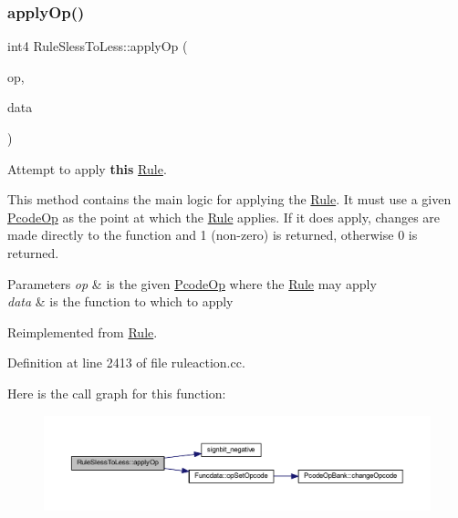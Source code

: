 \subsubsection{\texorpdfstring{applyOp()}{applyOp()}}
{\footnotesize\ttfamily int4 Rule\+Sless\+To\+Less\+::apply\+Op (\begin{DoxyParamCaption}\item[{\mbox{\hyperlink{class_pcode_op}{Pcode\+Op}} $\ast$}]{op,  }\item[{\mbox{\hyperlink{class_funcdata}{Funcdata}} \&}]{data }\end{DoxyParamCaption})\hspace{0.3cm}{\ttfamily [virtual]}}



Attempt to apply {\bfseries{this}} \mbox{\hyperlink{class_rule}{Rule}}. 

This method contains the main logic for applying the \mbox{\hyperlink{class_rule}{Rule}}. It must use a given \mbox{\hyperlink{class_pcode_op}{Pcode\+Op}} as the point at which the \mbox{\hyperlink{class_rule}{Rule}} applies. If it does apply, changes are made directly to the function and 1 (non-\/zero) is returned, otherwise 0 is returned. 
\begin{DoxyParams}{Parameters}
{\em op} & is the given \mbox{\hyperlink{class_pcode_op}{Pcode\+Op}} where the \mbox{\hyperlink{class_rule}{Rule}} may apply \\
\hline
{\em data} & is the function to which to apply \\
\hline
\end{DoxyParams}


Reimplemented from \mbox{\hyperlink{class_rule_a4e3e61f066670175009f60fb9dc60848}{Rule}}.



Definition at line 2413 of file ruleaction.\+cc.

Here is the call graph for this function\+:
\nopagebreak
\begin{figure}[H]
\begin{center}
\leavevmode
\includegraphics[width=350pt]{class_rule_sless_to_less_add6def135ebd895fd30990297c3dd280_cgraph}
\end{center}
\end{figure}
\mbox{\label{class_rule_sless_to_less_a6d17357335c8beaa9c06daa55f9b7fc9}} 
